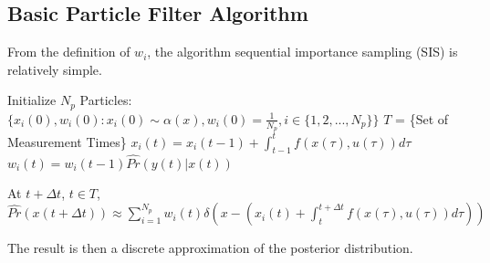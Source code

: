 \subsection{Basic Particle Filter Algorithm}
From the definition of $w_i$, the algorithm sequential importance sampling (SIS) 
is relatively simple. 

\begin{algorithmic}
\STATE Initialize $N_p$ Particles: 
        $\{x_i(0),w_i(0) : x_i(0) \sim \alpha(x), w_i(0) = \frac{1}{N_p}, i \in \{1, 2, ... , N_p\} \}$
\STATE $T$ = \{Set of Measurement Times\}
        \STATE $x_i(t) = x_i(t-1) + \int_{t-1}^t f(x(\tau), u(\tau)) d\tau $
        \STATE $w_i(t) = w_i(t-1)\hat{Pr}(y(t) | x(t))$
    \ENDFOR
\ENDFOR

\STATE At $t + \Delta t$, $t \in T$, $\hat{Pr}(x(t+\Delta t)) \approx 
\sum_{i=1}^{N_p} w_i(t)\delta\left(x - (x_i(t) + \int_t^{t+\Delta t} f(x(\tau), u(\tau)) d\tau) \right)$
\end{algorithmic}
The result is then a discrete approximation of the posterior distribution. 


